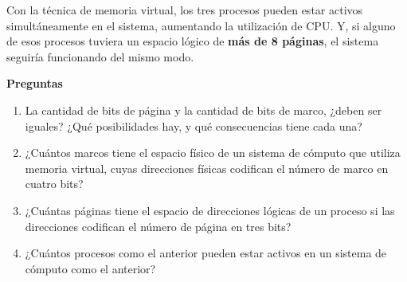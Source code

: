 \documentclass[spanish,a4paper,]{article}
\providecommand{\tightlist}{%
  \setlength{\itemsep}{0pt}\setlength{\parskip}{0pt}}
\begin{document}
Con la técnica de memoria virtual, los tres procesos pueden estar
activos simultáneamente en el sistema, aumentando la utilización de CPU.
Y, si alguno de esos procesos tuviera un espacio lógico de \textbf{más
de 8 páginas}, el sistema seguiría funcionando del mismo modo.

\textbf{Preguntas}

\begin{enumerate}
\def\labelenumi{\arabic{enumi}.}
\tightlist
\item
  La cantidad de bits de página y la cantidad de bits de marco, ¿deben
  ser iguales? ¿Qué posibilidades hay, y qué consecuencias tiene cada
  una?
\item
  ¿Cuántos marcos tiene el espacio físico de un sistema de cómputo que
  utiliza memoria virtual, cuyas direcciones físicas codifican el número
  de marco en cuatro bits?
\item
  ¿Cuántas páginas tiene el espacio de direcciones lógicas de un proceso
  si las direcciones codifican el número de página en tres bits?
\item
  ¿Cuántos procesos como el anterior pueden estar activos en un sistema
  de cómputo como el anterior?
\end{enumerate}
\end{document}
